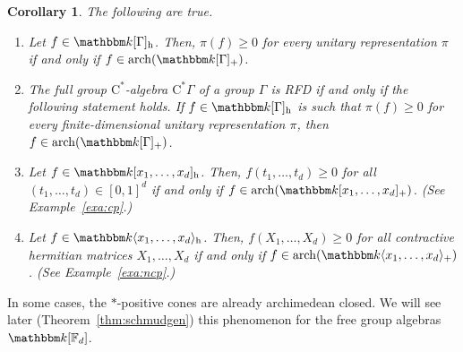 \documentclass[12pt]{amsart}
\newtheorem{cor}[thm]{Corollary}
\theoremstyle{definition}
\begin{document}
\begin{cor}\label{cor:poss}
The following are true.
\begin{enumerate}[$\bullet$]
\item
Let $f\in{{\mathbbm k}}[{\Gamma}]_{\mathrm{h}}$. Then, $\pi(f)\geq0$ for every unitary representation $\pi$
if and only if $f\in\operatorname*{arch}({{\mathbbm k}}[{\Gamma}]_+)$.
\item
The full group {$\mathrm{C}^*$-alge\-bra\xspace} $\mathrm{C}^*{\Gamma}$ of a group ${\Gamma}$
is RFD if and only if the following statement holds.
If $f\in{{\mathbbm k}}[{\Gamma}]_{\mathrm{h}}$ is such that $\pi(f)\geq0$ for every finite-dimensional
unitary representation $\pi$, then $f\in\operatorname*{arch}({{\mathbbm k}}[{\Gamma}]_+)$.
\item
Let $f\in{{\mathbbm k}}[x_1,\ldots,x_d]_{\mathrm{h}}$. Then, $f(t_1,\ldots,t_d)\geq0$ for
all $(t_1,\ldots,t_d)\in[0,1]^d$ if and only if
$f\in\operatorname*{arch}({{\mathbbm k}}[x_1,\ldots,x_d]_+)$. (See Example~\ref{exa:cp}.)
\item
Let $f\in{{\mathbbm k}}\langle x_1,\ldots,x_d\rangle_{\mathrm{h}}$. Then, $f(X_1,\ldots,X_d)\geq0$ for
all contractive hermitian matrices $X_1,\ldots,X_d$ if and only if
$f\in \operatorname*{arch}({{\mathbbm k}}\langle x_1,\ldots,x_d\rangle_+)$.
(See Example~\ref{exa:ncp}.)
\end{enumerate}
\end{cor}
In some cases, the $*$-positive cones are already archimedean closed.
We will see later (Theorem~\ref{thm:schmudgen}) this phenomenon for the free group algebras ${{\mathbbm k}}[{{\mathbb F}}_d]$.
\end{document}
